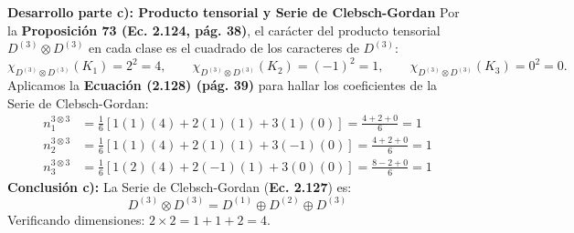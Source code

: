 \documentclass[11pt, a4paper]{article}
\begin{document}
\vspace{2mm}
\noindent \textbf{Desarrollo parte c): Producto tensorial y Serie de Clebsch-Gordan}
Por la \textbf{Proposición 73 (Ec. 2.124, pág. 38)}, el carácter del producto tensorial $D^{(3)} \otimes D^{(3)}$ en cada clase es el cuadrado de los caracteres de $D^{(3)}$:
\[
\chi_{D^{(3)}\otimes D^{(3)}}(K_1) = 2^2 = 4, \qquad \chi_{D^{(3)}\otimes D^{(3)}}(K_2) = (-1)^2 = 1, \qquad \chi_{D^{(3)}\otimes D^{(3)}}(K_3) = 0^2 = 0.
\]
Aplicamos la \textbf{Ecuación (2.128) (pág. 39)} para hallar los coeficientes de la Serie de Clebsch-Gordan:
\begin{align*}
n_1^{3\otimes 3} &= \frac{1}{6} \left[ 1(1)(4) + 2(1)(1) + 3(1)(0) \right] = \frac{4 + 2 + 0}{6} = 1 \\
n_2^{3\otimes 3} &= \frac{1}{6} \left[ 1(1)(4) + 2(1)(1) + 3(-1)(0) \right] = \frac{4 + 2 + 0}{6} = 1 \\
n_3^{3\otimes 3} &= \frac{1}{6} \left[ 1(2)(4) + 2(-1)(1) + 3(0)(0) \right] = \frac{8 - 2 + 0}{6} = 1
\end{align*}
\textbf{Conclusión c):} La Serie de Clebsch-Gordan (\textbf{Ec. 2.127}) es:
\[
D^{(3)} \otimes D^{(3)} = D^{(1)} \oplus D^{(2)} \oplus D^{(3)}
\]
Verificando dimensiones: $2 \times 2 = 1 + 1 + 2 = 4$.
\end{document}

